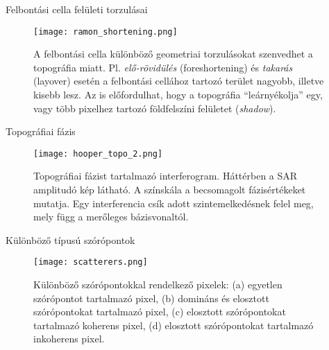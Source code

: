 \documentclass[14pt, aspectratio=169]{beamer}
\newcommand{\backupbegin}{
   \newcounter{finalframe}
   \setcounter{finalframe}{\value{framenumber}}
}
\begin{document}
\backupbegin


\begin{frame}{Felbontási cella felületi torzulásai}
    \begin{figure}
        \centering
        \texttt{[image: ramon\_shortening.png]}
        \caption{A felbontási cella különböző geometriai torzulásokat szenvedhet a topográfia miatt. Pl. \textit{elő-rövidülés} (foreshortening) és \textit{takarás} (layover) esetén a felbontási cellához tartozó terület nagyobb, illetve kisebb lesz. Az is előfordulhat, hogy a topográfia ``leárnyékolja'' egy, vagy több pixelhez tartozó földfelszíni felületet (\textit{shadow}).}
    \end{figure}
\end{frame}

\begin{frame}{Topográfiai fázis}
    \begin{center}
        \begin{figure}
            \centering
            \texttt{[image: hooper\_topo\_2.png]}
            \caption{Topográfiai fázist tartalmazó interferogram. Háttérben a SAR amplitudó kép látható. A színskála a becsomagolt fázisértékeket mutatja. Egy interferencia csík adott szintemelkedésnek felel meg, mely függ a merőleges bázisvonaltól.}
        \end{figure}
    \end{center}
\end{frame}


\begin{frame}{Különböző típusú szórópontok}
    \begin{figure}
        \centering
        \texttt{[image: scatterers.png]}
        \caption{Különböző szórópontokkal rendelkező pixelek: (a) egyetlen szórópontot tartalmazó pixel, (b) domináns és elosztott szórópontokat tartalmazó pixel, (c) elosztott szórópontokat tartalmazó koherens pixel, (d) elosztott szórópontokat tartalmazó inkoherens pixel.}
    \end{figure}
\end{frame}

\end{document}
